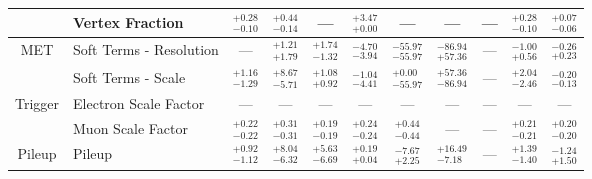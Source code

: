 \begin{tabular}{|cl||ccccccc|c||c|}
\cline{2-11}
&Vertex Fraction &  $^{+0.28}_{-0.10}$  &  $^{+0.44}_{-0.14}$  & --- &  $^{+3.47}_{+0.00}$  & --- & --- & --- &  $^{+0.28}_{-0.10}$  &  $^{+0.07}_{-0.06}$ \\ 
\hline
\multirow{2}{*}{MET}
&Soft Terms - Resolution & --- &  $^{+1.21}_{+1.79}$  &  $^{+1.74}_{-1.32}$  &  $^{-4.70}_{-3.94}$  &  $^{-55.97}_{-55.97}$  &  $^{-86.94}_{+57.36}$  & --- &  $^{-1.00}_{+0.56}$  &  $^{-0.26}_{+0.23}$ \\ 
\cline{2-11}
&Soft Terms - Scale &  $^{+1.16}_{-1.29}$  &  $^{+8.67}_{-5.71}$  &  $^{+1.08}_{+0.92}$  &  $^{-1.04}_{-4.41}$  &  $^{+0.00}_{-55.97}$  &  $^{+57.36}_{-86.94}$  & --- &  $^{+2.04}_{-2.46}$  &  $^{-0.20}_{-0.13}$ \\ 
\hline
\multirow{2}{*}{Trigger}
&Electron Scale Factor & --- & --- & --- & --- & --- & --- & --- & --- & ---\\ 
\cline{2-11}
&Muon Scale Factor &  $^{+0.22}_{-0.22}$  &  $^{+0.31}_{-0.31}$  &  $^{+0.19}_{-0.19}$  &  $^{+0.24}_{-0.24}$  &  $^{+0.44}_{-0.44}$  & --- & --- &  $^{+0.21}_{-0.21}$  &  $^{+0.20}_{-0.20}$ \\ 
\hline
\multirow{1}{*}{Pileup}
&Pileup &  $^{+0.92}_{-1.12}$  &  $^{+8.04}_{-6.32}$  &  $^{+5.63}_{-6.69}$  &  $^{+0.19}_{+0.04}$  &  $^{-7.67}_{+2.25}$  &  $^{+16.49}_{-7.18}$  & --- &  $^{+1.39}_{-1.40}$  &  $^{-1.24}_{+1.50}$ \\ 
\hline
\end{tabular}
